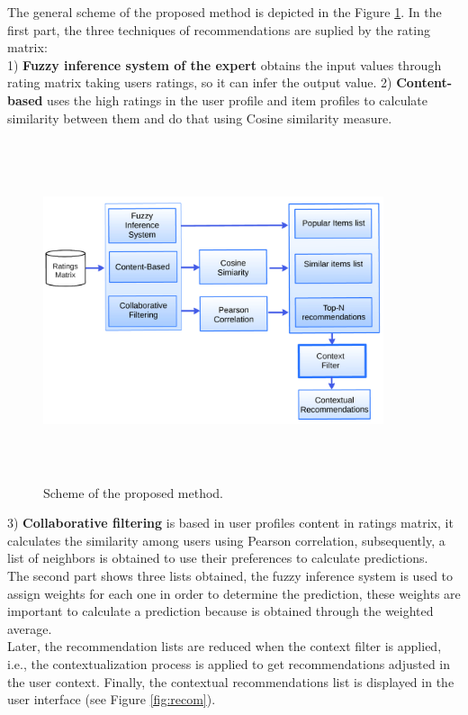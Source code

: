 The general scheme of the proposed method is depicted in the 
Figure  \ref{fig:archit}. In the first part, the three techniques of
recommendations are suplied by the rating matrix: \\ 
1) \textbf{Fuzzy inference system of the expert}  obtains the input 
values  through rating matrix taking users ratings, so it can infer 
the output value.
2) \textbf{Content-based} uses the high ratings in the user profile 
and item profiles to calculate similarity between them and do that using Cosine
similarity measure.
\begin{figure}
\captionsetup{font=footnotesize}
\centering 
\includegraphics[width=10cm,height=10cm,keepaspectratio]{img/archit.png}
\caption{Scheme of the proposed method.}
\label{fig:archit}  
\end{figure}
3) \textbf{Collaborative filtering} is based in user profiles content in
ratings matrix, it calculates the similarity among  users using
Pearson correlation, subsequently,  a list of neighbors is obtained to
use their preferences to calculate predictions.\\
The second part shows three lists obtained, the fuzzy inference system
is used to assign weights for each one in order to determine the
prediction, these weights are important to calculate a
prediction because is obtained through the weighted average.\\
Later, the recommendation lists are reduced when the context filter is
applied, i.e., the contextualization process is applied to get
recommendations adjusted in the user context. 
Finally, the contextual recommendations list is displayed in the 
user interface (see Figure \ref{fig:recom}).


